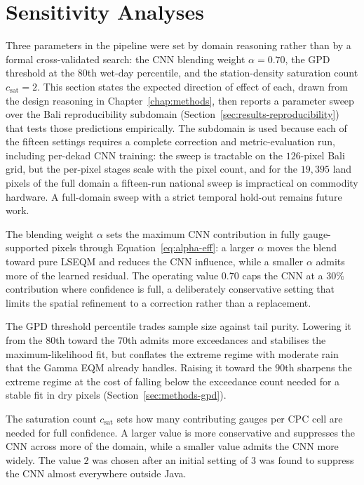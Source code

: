 \section{Sensitivity Analyses}\label{sec:results-sensitivity}

Three parameters in the pipeline were set by domain reasoning
rather than by a formal cross-validated search: the CNN blending
weight $\alpha = 0.70$, the GPD threshold at the $80$th wet-day
percentile, and the station-density saturation count
$c_{\text{sat}} = 2$. This section states the expected
direction of effect of each, drawn from the design reasoning in
Chapter~\ref{chap:methods}, then reports a parameter sweep over
the Bali reproducibility subdomain
(Section~\ref{sec:results-reproducibility}) that tests those
predictions empirically. The subdomain is used because each of the
fifteen settings requires a complete correction and
metric-evaluation run, including per-dekad CNN training: the sweep
is tractable on the $126$-pixel Bali grid, but the per-pixel stages
scale with the pixel count, and for the $19{,}395$ land
pixels of the full domain a fifteen-run national sweep is impractical
on commodity hardware. A full-domain sweep with a strict temporal
hold-out remains future work.

The blending weight $\alpha$ sets the maximum CNN contribution
in fully gauge-supported pixels through
Equation~\eqref{eq:alpha-eff}: a larger $\alpha$ moves the
blend toward pure LSEQM and reduces the CNN influence, while a
smaller $\alpha$ admits more of the learned residual. The
operating value $0.70$ caps the CNN at a $30\%$ contribution
where confidence is full, a deliberately conservative setting
that limits the spatial refinement to a correction rather than
a replacement.

The GPD threshold percentile trades sample size
against tail purity. Lowering it from the $80$th toward the
$70$th admits more exceedances and stabilises the maximum-likelihood
fit, but conflates the extreme regime with moderate rain that the
Gamma EQM already handles. Raising it toward the $90$th
sharpens the extreme regime at the cost of falling below the
exceedance count needed for a stable fit in dry pixels
(Section~\ref{sec:methods-gpd}).

The saturation count
$c_{\text{sat}}$ sets how many contributing gauges per CPC cell
are needed for full confidence. A larger value is more
conservative and suppresses the CNN across more of the domain,
while a smaller value admits the CNN more widely. The value $2$
was chosen after an initial setting of $3$ was found to suppress
the CNN almost everywhere outside Java.

